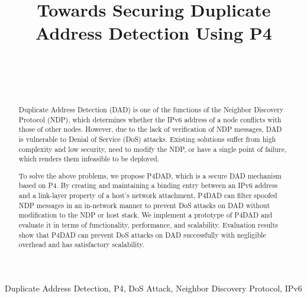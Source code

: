 \documentclass[journal]{IEEEtran}
\begin{document}
\title{Towards Securing Duplicate Address Detection Using P4}

\author{
  \\
  \\
  \\
}

\maketitle
\begin{abstract}
    Duplicate Address Detection (DAD) is one of the functions of the Neighbor Discovery Protocol (NDP), which determines whether the IPv6 address of a node conflicts with those of other nodes. 
    However, due to the lack of verification of NDP messages, DAD is vulnerable to Denial of Service (DoS) attacks. 
    Existing solutions suffer from high complexity and low security, need to modify the NDP, or have a single point of failure, which renders them infeasible to be deployed.
     
    To solve the above problems, we propose P4DAD, which is a secure DAD mechanism based on P4. By creating and maintaining a binding entry between an IPv6 address and a link-layer property of a host's network attachment, P4DAD can filter spoofed NDP messages in an in-network manner to prevent DoS attacks on DAD without modification to the NDP or host stack. 
    We implement a prototype of P4DAD and evaluate it in terms of functionality, performance, and scalability. Evaluation results show that P4DAD can prevent DoS attacks on DAD successfully with negligible overhead and has satisfactory scalability.
    
\end{abstract}

\begin{IEEEkeywords}
    Duplicate Address Detection, P4, DoS Attack, Neighbor Discovery Protocol, IPv6 
\end{IEEEkeywords}
\end{document}
